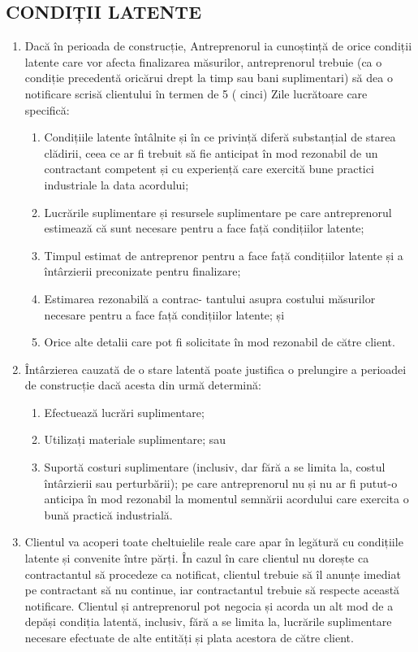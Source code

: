 \begin{multicols}{2}
\subsection{CONDIȚII LATENTE}
\begin{enumerate}
\item Dacă în perioada de construcție, Antreprenorul ia cunoștință de orice condiții latente care vor afecta finalizarea măsurilor, antreprenorul trebuie (ca o condiție precedentă oricărui drept la timp sau bani suplimentari) să dea o notificare scrisă clientului în termen de 5 ( cinci) Zile lucrătoare care specifică:
  \begin{enumerate}
\item Condițiile latente întâlnite și în ce privință diferă substanțial de starea clădirii, ceea ce ar fi trebuit să fie anticipat în mod rezonabil de un contractant competent și cu experiență care exercită bune practici industriale la data acordului;
\item Lucrările suplimentare și resursele suplimentare pe care antreprenorul estimează că sunt necesare pentru a face față condițiilor latente;
\item Timpul estimat de antreprenor pentru a face față condițiilor latente și a întârzierii preconizate pentru finalizare;
\item Estimarea rezonabilă a contrac- tantului asupra costului măsurilor necesare pentru a face față condițiilor latente; și
\item Orice alte detalii care pot fi solicitate în mod rezonabil de către client.
\end{enumerate}
\item Întârzierea cauzată de o stare latentă poate justifica o prelungire a perioadei de construcție dacă acesta din urmă determină:
  \begin{enumerate}
\item Efectuează lucrări suplimentare;
\item Utilizați materiale suplimentare; sau
\item Suportă costuri suplimentare (inclusiv, dar fără a se limita la, costul întârzierii sau perturbării); pe care antreprenorul nu și nu ar fi putut-o anticipa în mod rezonabil la momentul semnării acordului care exercita o bună practică industrială.
\end{enumerate}
\item Clientul va acoperi toate cheltuielile reale care apar în legătură cu condițiile latente și convenite între părți. În cazul în care clientul nu dorește ca contractantul să procedeze ca notificat, clientul trebuie să îl anunțe imediat pe contractant să nu continue, iar contractantul trebuie să respecte această notificare. Clientul și antreprenorul pot negocia și acorda un alt mod de a depăși condiția latentă, inclusiv, fără a se limita la, lucrările suplimentare necesare efectuate de alte entități și plata acestora de către client.

\end{enumerate}
\end{multicols}
